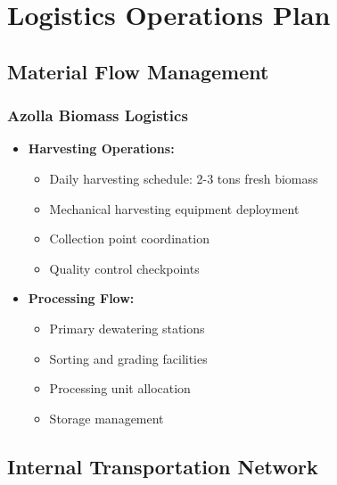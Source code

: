 \section{Logistics Operations Plan}

\subsection{Material Flow Management}

\subsubsection{Azolla Biomass Logistics}
\begin{itemize}
    \item \textbf{Harvesting Operations:}
    \begin{itemize}
        \item Daily harvesting schedule: 2-3 tons fresh biomass
        \item Mechanical harvesting equipment deployment
        \item Collection point coordination
        \item Quality control checkpoints
    \end{itemize}
    
    \item \textbf{Processing Flow:}
    \begin{itemize}
        \item Primary dewatering stations
        \item Sorting and grading facilities
        \item Processing unit allocation
        \item Storage management
    \end{itemize}
\end{itemize}

\subsection{Internal Transportation Network}

